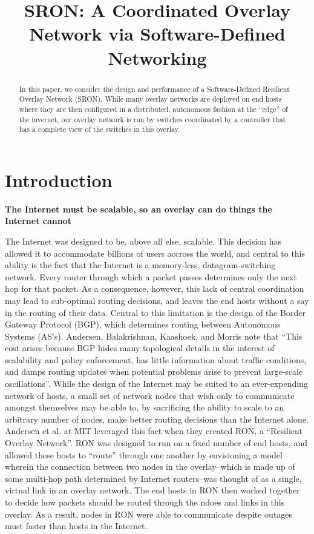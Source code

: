 \documentclass[pageno]{jpaper}
\begin{document}
\title{
SRON: A Coordinated Overlay Network via Software-Defined Networking
}
\date{}
\maketitle

\thispagestyle{empty}

\begin{abstract}

In this paper, we consider the design and performance of a Software-Defined
Resilient Overlay Network (SRON). While many overlay networks are deployed
on end hosts where they are then configured in a distributed, autonomous
fashion at the ``edge'' of the invernet, our overlay network is run by switches coordinated by a controller
that has a complete view of the switches in this overlay. 

\end{abstract}

\section{Introduction}

{\bf The Internet must be scalable, so an overlay can do things the Internet cannot}\bigskip

The Internet was designed to be, above all else, scalable. This decision
has allowed it to accommodate billions of users accross the world, and central
to this ability is the fact that the Internet is a memory-less, datagram-switching
network. Every router through which a packet passes determines only the next
hop for that packet. As a consequence, however, this lack of central coordination
may lead to sub-optimal routing decisions, and leaves the end hosts without a 
say in the routing of their data.  Central to this limitation is the design of 
the Border Gateway Protocol (BGP), which determines routing between Autonomous
Systems (AS's).  Andersen, Balakrishnan, Kaashoek, and Morris note that 
``This cost arises because BGP hides many topological details in the interest of
scalability and policy enforcement, has little information about traffic conditions,
and damps routing updates when potential problems arise to prevent large-scale
oscillations''\cite{ron}.  
While the design of the Internet may be suited to an ever-expending network 
of hosts, a small set of network nodes that wish only to communicate amongst
themselves may be able to, by sacrificing the ability to scale to an arbitrary
number of nodes, make better routing decisions than the Internet alone.
Andersen et al. at MIT leveraged this fact when they created RON, a 
``Resilient Overlay Network''. RON was designed to run on a fixed number of 
end hosts, and allowed these hosts to ``route'' through one another by envisioning
a model wherein the connection between two nodes in the overlay--which is made
up of some multi-hop path determined by Internet routers--was thought of as a
single, virtual link in an overlay network. The end hosts in RON then worked 
together to decide how packets should be routed through the ndoes and links in this
overlay. As a result, nodes in RON were able to communicate despite outages 
must faster than hosts in the Internet.\bigskip
\end{document}
